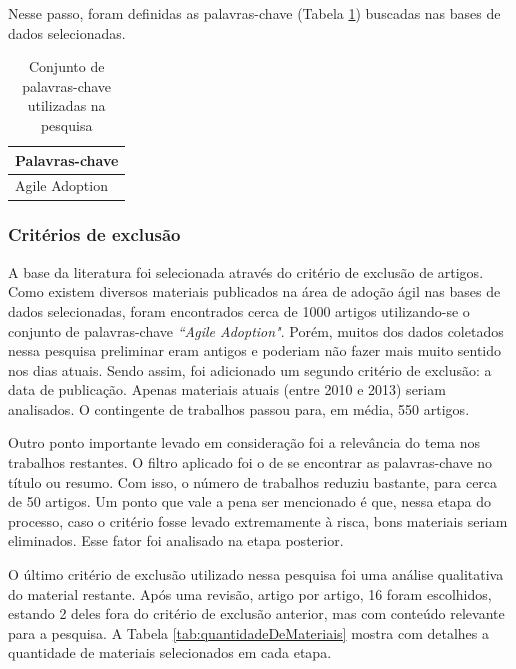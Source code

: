 Nesse passo, foram definidas as palavras-chave (Tabela \ref{tab:palavrasChave}) buscadas nas bases de dados selecionadas.

\begin{table}[H]
	\centering
	\begin{tabular}{| l |} \hline \textbf{Palavras-chave} \\ \hline
		Agile Adoption \\ \hline
	\end{tabular}
	\caption{Conjunto de palavras-chave utilizadas na pesquisa}
	\label{tab:palavrasChave}
\end{table}

\subsubsection{Critérios de exclusão}

A base da literatura foi selecionada através do critério de exclusão de artigos. Como existem diversos materiais publicados na área de adoção ágil nas bases de dados selecionadas, foram encontrados cerca de 1000 artigos utilizando-se o conjunto de palavras-chave \textit{``Agile Adoption"}. Porém, muitos dos dados coletados nessa pesquisa preliminar eram antigos e poderiam não fazer mais muito sentido nos dias atuais. Sendo assim, foi adicionado um segundo critério de exclusão: a data de publicação. Apenas materiais atuais (entre 2010 e 2013) seriam analisados. O contingente de trabalhos passou para, em média, 550 artigos.

Outro ponto importante levado em consideração foi a relevância do tema nos trabalhos restantes. O filtro aplicado foi o de se encontrar as palavras-chave no título ou resumo. Com isso, o número de trabalhos reduziu bastante, para cerca de 50 artigos. Um ponto que vale a pena ser mencionado é que, nessa etapa do processo, caso o critério fosse levado extremamente à risca, bons materiais seriam eliminados. Esse fator foi analisado na etapa posterior.

O último critério de exclusão utilizado nessa pesquisa foi uma análise qualitativa do material restante. Após uma revisão, artigo por artigo, 16 foram escolhidos, estando 2 deles fora do critério de exclusão anterior, mas com conteúdo relevante para a pesquisa. A Tabela  \ref{tab:quantidadeDeMateriais} mostra com detalhes a quantidade de materiais selecionados em cada etapa.

